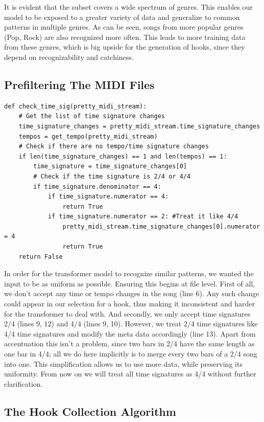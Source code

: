 \documentclass[a4paper,12pt]{extarticle}
\begin{document}
\vspace{0.1cm}
\raggedright It is evident that the subset covers a wide spectrum of genres. This enables our model to be exposed to a greater variety of data and generalize to common patterns in multiple genres. As can be seen, songs from more popular genres (Pop, Rock) are also recognized more often. This leads to more training data from these genres, which is big upside for the generation of hooks, since they depend on recognizability and catchiness.

\subsection{Prefiltering The MIDI Files}
\begin{lstlisting}
def check_time_sig(pretty_midi_stream):
    # Get the list of time signature changes
    time_signature_changes = pretty_midi_stream.time_signature_changes
    tempos = get_tempo(pretty_midi_stream)
    # Check if there are no tempo/time signature changes
    if len(time_signature_changes) == 1 and len(tempos) == 1:
        time_signature = time_signature_changes[0]
        # Check if the time signature is 2/4 or 4/4
        if time_signature.denominator == 4:
            if time_signature.numerator == 4:
                return True
            if time_signature.numerator == 2: #Treat it like 4/4
                pretty_midi_stream.time_signature_changes[0].numerator = 4
                return True
    return False
\end{lstlisting}
\vspace{0.2cm}
In order for the transformer model to recognize similar patterns, we wanted the input to be as uniform as possible. Ensuring this begins at file level. First of all, we don't accept any time or tempo changes in the song (line 6). Any such change could appear in our selection for a hook, thus making it inconsistent and harder for the transformer to deal with. And secondly, we only accept time signatures 2/4 (lines 9, 12) and 4/4 (lines 9, 10). However, we treat 2/4 time signatures like 4/4 time signatures and modify the meta data accordingly (line 13). Apart from accentuation this isn't a problem, since two bars in 2/4 have the same length as one bar in 4/4; all we do here implicitly is to merge every two bars of a 2/4 song into one. This simplification allows us to use more data, while preserving its uniformity. From now on we will treat all time signatures as 4/4 without further clarification.


\subsection{The Hook Collection Algorithm}
\end{document}
